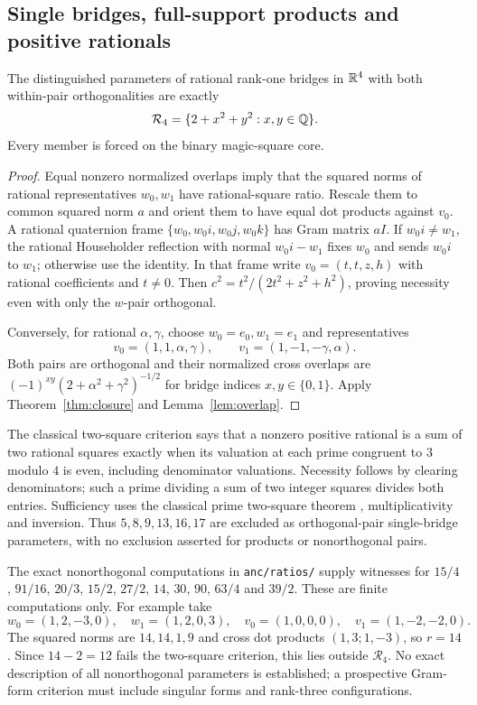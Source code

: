\subsection{Single bridges, full-support products and positive rationals}
\begin{theorem}\label{thm:orthogonal}
The distinguished parameters of rational rank-one bridges in $\mathbb R^4$ with both within-pair orthogonalities are exactly
\[
 \mathcal R_4=\{2+x^2+y^2:x,y\in\mathbb Q\}.
\]
Every member is forced on the binary magic-square core.
\end{theorem}
\begin{proof}
Equal nonzero normalized overlaps imply that the squared norms of rational representatives $w_0,w_1$ have rational-square ratio. Rescale them to common squared norm $a$ and orient them to have equal dot products against $v_0$. A rational quaternion frame $\{w_0,w_0i,w_0j,w_0k\}$ has Gram matrix $aI$. If $w_0i\ne w_1$, the rational Householder reflection with normal $w_0i-w_1$ fixes $w_0$ and sends $w_0i$ to $w_1$; otherwise use the identity. In that frame write $v_0=(t,t,z,h)$ with rational coefficients and $t\ne0$. Then $c^2=t^2/(2t^2+z^2+h^2)$, proving necessity even with only the $w$-pair orthogonal.

Conversely, for rational $\alpha,\gamma$, choose $w_0=e_0,w_1=e_1$ and representatives
\[
 v_0=(1,1,\alpha,\gamma),\qquad v_1=(1,-1,-\gamma,\alpha).
\]
Both pairs are orthogonal and their normalized cross overlaps are $(-1)^{xy}(2+\alpha^2+\gamma^2)^{-1/2}$ for bridge indices $x,y\in\{0,1\}$. Apply Theorem~\ref{thm:closure} and Lemma~\ref{lem:overlap}.
\end{proof}
The classical two-square criterion says that a nonzero positive rational is a sum of two rational squares exactly when its valuation at each prime congruent to $3$ modulo $4$ is even, including denominator valuations. Necessity follows by clearing denominators; such a prime dividing a sum of two integer squares divides both entries. Sufficiency uses the classical prime two-square theorem \cite{Zagier}, multiplicativity and inversion. Thus $5,8,9,13,16,17$ are excluded as orthogonal-pair single-bridge parameters, with no exclusion asserted for products or nonorthogonal pairs.

The exact nonorthogonal computations in \texttt{anc/ratios/} supply witnesses for $15/4$, $91/16$, $20/3$, $15/2$, $27/2$, $14$, $30$, $90$, $63/4$ and $39/2$. These are finite computations only. For example take
\[
 w_0=(1,2,-3,0),\quad w_1=(1,2,0,3),\quad
 v_0=(1,0,0,0),\quad v_1=(1,-2,-2,0).
\]
The squared norms are $14,14,1,9$ and cross dot products $(1,3;1,-3)$, so $r=14$. Since $14-2=12$ fails the two-square criterion, this lies outside $\mathcal R_4$. No exact description of all nonorthogonal parameters is established; a prospective Gram-form criterion must include singular forms and rank-three configurations.

